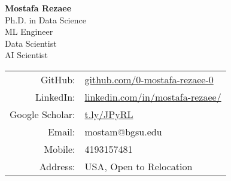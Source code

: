 \documentclass[11pt]{article}
\begin{document}
\begin{center}
	\begin{minipage}{0.46\textwidth}
		{\Huge\bfseries
			Mostafa Rezaee  %
		} \\ \medskip
		Ph.D. in Data Science \\ %
		ML Engineer \\
		Data Scientist \\
		AI Scientist 
	\end{minipage} \hfill
	\begin{minipage}{0.53\textwidth}
		\begin{tabular}{rl}
			GitHub: & \href{https://github.com/0-mostafa-rezaee-0}{github.com/0-mostafa-rezaee-0} \\
			LinkedIn: & \href{https://www.linkedin.com/in/mostafa-rezaee/}{linkedin.com/in/mostafa-rezaee/} \\
			Google Scholar: & \href{https://scholar.google.com/citations?user=jvcCIJYAAAAJ&hl=en}{t.ly/JPyRL} \\
			Email: & mostam@bgsu.edu \\
			Mobile: & 4193157481 \\
			Address: & USA, Open to Relocation
		\end{tabular}
	\end{minipage}
\end{center}

\end{document}
